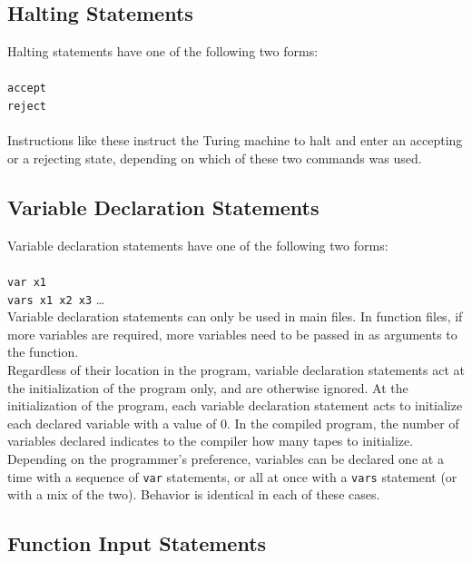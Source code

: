 \documentclass{report}
\begin{document}
\subsection{Halting Statements}

Halting statements have one of the following two forms: \\ \\
\texttt{accept} \\
\texttt{reject} \\ \\

Instructions like these instruct the Turing machine to halt and enter an accepting or a rejecting state, depending on which of these two commands was used. 

\subsection{Variable Declaration Statements}

Variable declaration statements have one of the following two forms: \\ \\
\texttt{var x1} \\
\texttt{vars x1 x2 x3} \dots \\

Variable declaration statements can only be used in main files. In function files, if more variables are required, more variables need to be passed in as arguments to the function. \\

Regardless of their location in the program, variable declaration statements act at the initialization of the program only, and are otherwise ignored. At the initialization of the program, each variable declaration statement acts to initialize each declared variable with a value of 0. In the compiled program, the number of variables declared indicates to the compiler how many tapes to initialize. \\

Depending on the programmer's preference, variables can be declared one at a time with a sequence of \texttt{var} statements, or all at once with a \texttt{vars} statement (or with a mix of the two). Behavior is identical in each of these cases.

\subsection{Function Input Statements}
\end{document}
